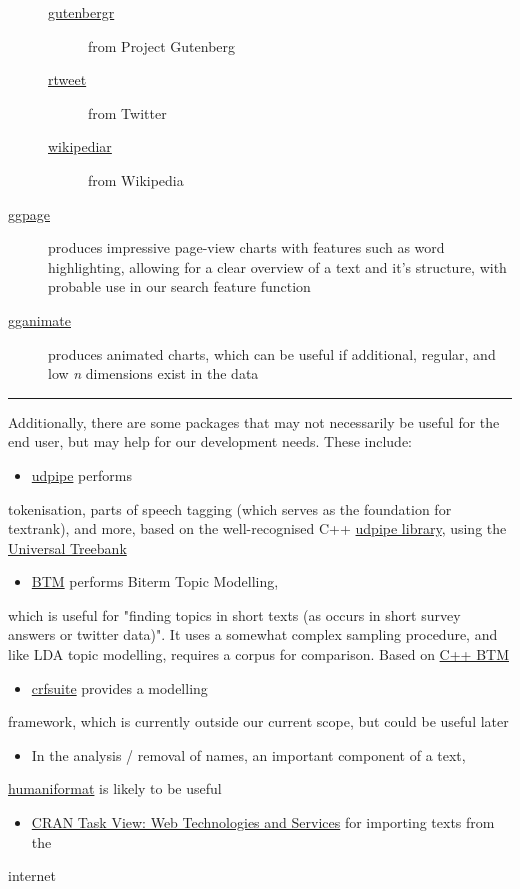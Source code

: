 \documentclass[a4paper, 11pt]{article}
\begin{document}
\begin{description}
\begin{description}
\item[{\href{https://cran.r-project.org/web/packages/gutenbergr/index.html}{gutenbergr}}] from Project Gutenberg
\item[{\href{https://rtweet.info/}{rtweet}}] from Twitter
\item[{\href{https://cran.r-project.org/web/packages/WikipediaR/index.html}{wikipediar}}] from Wikipedia
\end{description}

\item[{\href{https://github.com/EmilHvitfeldt/ggpage}{ggpage}}] produces impressive page-view charts with features such as
word highlighting, allowing for a clear overview of a text and
it's structure, with probable use in our search feature function

\item[{\href{https://github.com/thomasp85/gganimate}{gganimate}}] produces animated charts, which can be useful if
additional, regular, and low \emph{n} dimensions exist in the data
\end{description}

\noindent\rule{\textwidth}{0.5pt}

Additionally, there are some packages that may not necessarily be useful
for the end user, but may help for our development needs. These
include:
\begin{itemize}
\item \href{https://github.com/bnosac/udpipe}{udpipe} performs
\end{itemize}
tokenisation, parts of speech tagging (which serves as the foundation
for textrank), and more, based on the well-recognised C++
\href{http://ufal.mff.cuni.cz/udpipe}{udpipe library}, using the \href{https://universaldependencies.org}{Universal Treebank}
\begin{itemize}
\item \href{https://github.com/bnosac/BTM}{BTM} performs Biterm Topic Modelling,
\end{itemize}
which is useful for "finding topics in short texts (as occurs in short
survey answers or twitter data)". It uses a somewhat complex sampling
procedure, and like LDA topic modelling, requires a corpus for
comparison. Based on \href{https://github.com/xiaohuiyan/BTM}{C++ BTM} 
\begin{itemize}
\item \href{https://github.com/bnosac/crfsuite}{crfsuite} provides a modelling
\end{itemize}
framework, which is currently outside our current scope, but could be
useful later 
\begin{itemize}
\item In the analysis / removal of names, an important component of a text,
\end{itemize}
\href{https://github.com/ironholds/humaniformat/}{humaniformat} is likely to be useful
\begin{itemize}
\item \href{https://cran.r-project.org/web/views/WebTechnologies.html}{CRAN Task View: Web Technologies and Services} for importing texts from the
\end{itemize}
internet
\end{document}
